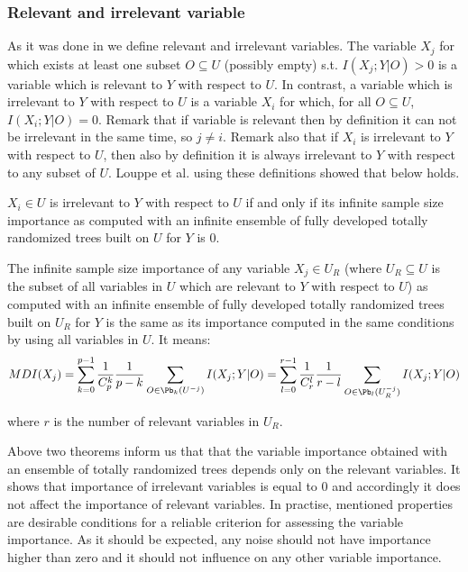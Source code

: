 \subsubsection{Relevant and irrelevant variable}

As it was done in \cite{kohavi1997importance} we define relevant and irrelevant variables. The variable $X_j$ for which exists at least one subset $O \subseteq U$ (possibly empty) s.t. $I(X_j;Y|O) > 0$ is a variable which is relevant to $Y$ with respect to $U$. In contrast, a variable which is irrelevant to $Y$ with respect to $U$ is a variable $X_i$ for which, for all 
 $O \subseteq U$, $I(X_i;Y|O) = 0$. Remark that if variable is relevant then by definition it can not be irrelevant in the same time, so $j \neq i$. Remark also that if $X_i$ is irrelevant to $Y$ with respect to $U$, then also by definition it is always irrelevant to $Y$ with respect to any subset of $U$. Louppe et al. using these definitions showed that below holds.

\begin{theorem}
	$X_i \in U$ is irrelevant to $Y$ with respect to $U$ if and only if its infinite sample size
	importance as computed with an infinite ensemble of fully developed totally randomized trees
	built on $U$ for $Y$ is 0.
\end{theorem}

\begin{theorem}
	 The infinite sample size importance of any variable $X_j \in U_R$ (where $U_R \subseteq U$ is the subset of all variables in $U$ which are relevant to $Y$ with respect to $U$) as computed with an infinite ensemble of fully developed totally randomized trees built on $U_R$ for $Y$ is the same as its importance computed in the same conditions by using all variables in $U$. It means:
\begin{equation}
	{MDI}( X_{j} ) = \displaystyle \sum_{k=0}^{p-1}\frac{1}{C^k_p}\frac{1}{p-k} \displaystyle\sum_{O \in \Pb_{k}(U^{-j})} I(X_j;Y|O) = 
	\displaystyle \sum_{l=0}^{r-1}\frac{1}{C^l_r}\frac{1}{r-l} \displaystyle\sum_{O \in \Pb_{l}(U^{-j}_R)} I(X_j;Y|O)
\end{equation}
\end{theorem}
 where $r$ is the number of relevant variables in $U_R$.
 \newline
 
Above two theorems inform us that that the variable importance obtained with an ensemble of totally randomized trees depends only on the relevant variables. It shows that importance of irrelevant variables is equal to 0 and accordingly it does not affect the importance of relevant variables. 
In practise, mentioned properties are desirable conditions for a reliable criterion for assessing the variable importance. As it should be expected, any noise should not have importance higher than zero and it should not influence on any other variable importance.

